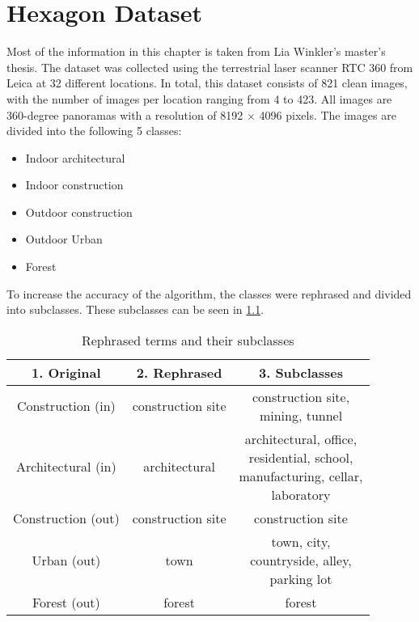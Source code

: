 \chapter{Hexagon Dataset
    \label{chapter:dataset}}
Most of the information in this chapter is taken from Lia Winkler's master's thesis.  
The dataset was collected using the terrestrial laser scanner RTC 360 from Leica at 32 different locations.  
In total, this dataset consists of 821 clean images, with the number of images per location ranging from 4 to 423.  
All images are 360-degree panoramas with a resolution of 8192 \(\times\) 4096 pixels.  
The images are divided into the following 5 classes:

\begin{itemize}
    \item Indoor architectural
    \item Indoor construction
    \item Outdoor construction
    \item Outdoor Urban
    \item Forest
\end{itemize}

\noindent
To increase the accuracy of the algorithm, the classes were rephrased and divided into subclasses.  
These subclasses can be seen in \cref{tab:dataset:subclasses}.

\begin{table}[!ht]
    \centering
    \begin{tabular}{ccc}
    \toprule
    \textbf{1. Original}& \textbf{2. Rephrased}& \textbf{3. Subclasses}\\ \midrule
    Construction (in) & construction site & \makecell{construction site,\\ mining, tunnel}\\ \hline
    Architectural (in)& architectural& \makecell{architectural, office,\\ residential, school,\\ manufacturing, cellar,\\ laboratory} \\ \hline
    Construction (out)& construction site & construction site \\ \hline
    Urban (out)& town & \makecell{town, city,\\countryside, alley,\\ parking lot} \\ \hline
    Forest (out)& forest& forest \\
    \bottomrule
    \end{tabular}
    \caption{Rephrased terms and their subclasses
        \label{tab:dataset:subclasses}}
\end{table}

